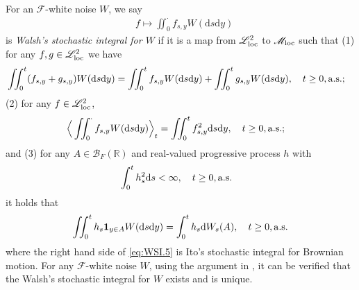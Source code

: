 \documentclass[12pt,a4paper]{amsart}
\numberwithin{equation}{section}
\theoremstyle{plain}
\theoremstyle{remark}
\begin{document}
For an $\mathcal F$-white noise $W$, we say
\begin{align} 
& f \mapsto \iint_0^\cdot f_{s,y}W(\mathrm ds\mathrm dy) 
\end{align}
 is \emph{Walsh's stochastic integral for $W$} if it is a map from $\mathscr L_{\rm loc}^2$ to $\mathscr M_{\rm loc}$ such that (1) for any $f, g \in \mathscr L_{{\rm loc}}^2$ we have
 \begin{align} 
 &  \iint_0^t (f_{s,y} + g_{s,y}) W(\mathrm ds\mathrm dy) 
 = \iint_0^t f_{s,y} W(\mathrm ds\mathrm dy) +  \iint_0^t g_{s,y} W(\mathrm ds\mathrm dy) , 
 \quad t\geq 0, {\rm a.s.};
 \end{align}  
(2) for any $f\in \mathscr L_{{\rm loc}}^2$,  
\begin{align}
& \Big\langle \iint_0^\cdot f_{s,y}W(\mathrm ds\mathrm dy) \Big\rangle_t = \iint_0^t f^2_{s,y}\mathrm ds\mathrm dy, 
\quad t\geq 0, {\rm a.s.};
\end{align}
and (3) for any $A \in \mathcal B_F(\mathbb R)$ and real-valued progressive process $h$ with 
\begin{align} 
& \int_0^t h_s^2 \mathrm ds < \infty, \quad t\geq 0, {\rm a.s.} 
\end{align}
it holds that 
\begin{equation} \label{eq:WSI.5}
\iint_0^t h_s \mathbf 1_{y\in A} W(\mathrm ds\mathrm dy) = \int_0^t h_s \mathrm d W_s(A), \quad t\geq 0, {\rm a.s.}
\end{equation}
where the right hand side of \eqref{eq:WSI.5} is Ito's stochastic integral for Brownian motion. 
For any $\mathcal F$-white noise $W$, using the argument in \cite[Section II.5]{Perkins2002Dawson-Watanabe}, it can be verified that the Walsh's stochastic integral for $W$ exists and is unique.
\end{document}
